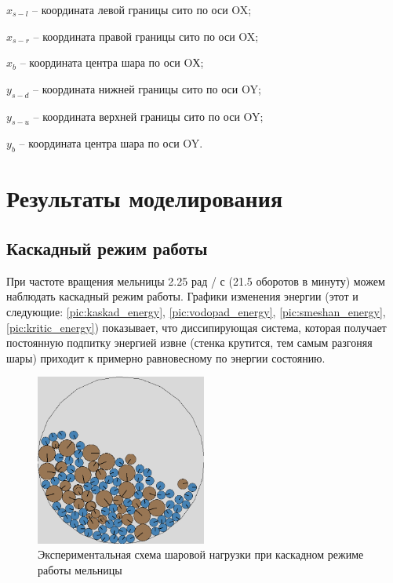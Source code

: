 \documentclass[utf8x, 14pt, oneside, a4paper]{article}
\begin{document}
$x_{s-l}$ -- координата левой границы сито по оси OX;

$x_{s-r}$ -- координата правой границы сито по оси OX;

$x_b$ -- координата центра шара по оси OХ;

$y_{s-d}$ -- координата нижней границы сито по оси OY;

$y_{s-u}$ -- координата верхней границы сито по оси OY;

$y_b$ -- координата центра шара по оси OY.




\pagebreak

\section{Результаты моделирования}

\subsection{Каскадный режим работы}

При частоте вращения мельницы 2.25 рад / с (21.5 оборотов в минуту) можем наблюдать каскадный режим работы.
Графики изменения энергии (этот и следующие: \ref{pic:kaskad_energy}, \ref{pic:vodopad_energy}, \ref{pic:smeshan_energy}, \ref{pic:kritic_energy}) показывает, что диссипирующая система, которая получает постоянную подпитку энергией извне (стенка крутится, тем самым разгоняя шары) приходит к примерно равновесному по энергии состоянию.

\begin{figure}[H]
	\centering
	\includegraphics[width=0.5\textwidth]{kaskad_result} 
	\caption{Экспериментальная схема шаровой нагрузки при каскадном режиме работы мельницы}
	\label{pic:kaskad_result}
\end{figure} 
\end{document}
